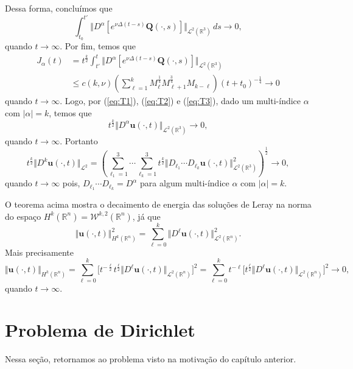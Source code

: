 \documentclass[a4paper, 11pt]{book}
\theoremstyle{definition}
\newcommand{\bR}{\mathbb{R}}
\newcommand{\bu}{\mathbf{u}}
\newcommand{\BQ}{\mathbf{Q}}
\newcommand{\cL}{\mathcal{L}}
\newcommand{\cW}{\mathcal{W}}
\begin{document}
\begin{prf}
    Dessa forma, concluímos que
    \begin{equation} \label{eq:T2}
        \int_{t_0}^{t'} \Vert D^\alpha [e^{\nu\Delta (t-s)}\BQ(\cdot,s)] \Vert_{\cL^2(\bR^3)} \,ds  \to 0,
    \end{equation}
    quando $t \to \infty$. 
    Por fim, temos que
    \begin{equation} \label{eq:T3}
        \begin{aligned}
            J_\alpha(t) &= t^{\frac{k}{2}} \int_{t'}^t \Vert D^\alpha[e^{\nu\Delta(t-s)}\BQ(\cdot,s)] \Vert_{\cL^2(\bR^3)} \\
            &\leqslant c(k,\nu) \left( \sum_{\ell=1}^k M_\ell^{\frac{1}{4}} M_{\ell+1}^{\frac{3}{4}} M_{k-\ell} \right) (t + t_0)^{-\frac{1}{4}} \to 0
        \end{aligned}
    \end{equation}
    quando $t \to \infty$. Logo, por (\ref{eq:T1}), (\ref{eq:T2}) e (\ref{eq:T3}), dado um multi-índice $\alpha$ com $|\alpha| = k$, temos que
    \[
        t^{\frac{k}{2}} \Vert D^\alpha \bu(\cdot,t) \Vert_{\cL^2(\bR^3)} \to 0,
    \]
    quando $t \to \infty$.
    Portanto
    \[
        t^{\frac{k}{2}} \Vert D^k \bu(\cdot,t) \Vert_{\cL^2} = \left( \sum_{\ell_1=1}^{3} \cdots \sum_{\ell_k=1}^3 t^{\frac{k}{2}} \Vert D_{\ell_1} \cdots D_{\ell_k} \bu(\cdot,t) \Vert_{\cL^2(\bR^3)}^2 \right)^{\frac{1}{2}} \to 0,
    \]
    quando $t \to \infty$ pois, $D_{\ell_1} \cdots D_{\ell_k} = D^\alpha$ para algum multi-índice $\alpha$ com $|\alpha| = k$.
\end{prf}


O teorema acima mostra o decaimento de energia das soluções de Leray na norma do espaço $H^k(\bR^n) = \cW^{k,2}(\bR^n)$, já que
\[
    \Vert \bu(\cdot,t) \Vert_{H^k(\bR^n)}^2 = \sum_{\ell = 0}^k \Vert D^\ell\bu(\cdot,t) \Vert_{\cL^2(\bR^n)}^2.
\]
Mais precisamente
\[
    \Vert \bu(\cdot,t) \Vert_{H^k(\bR^n)} = \sum_{\ell = 0}^k \big[ t^{-\frac{\ell}{2}} t^{\frac{\ell}{2}} \Vert D^\ell \bu(\cdot,t) \Vert_{\cL^2(\bR^n)} \big]^2 = \sum_{\ell = 0}^k t^{-\ell} \big[ t^{\frac{\ell}{2}} \Vert D^\ell \bu(\cdot,t) \Vert_{\cL^2(\bR^n)} \big]^2 \to 0,
\]
quando $t \to \infty$.

\section{Problema de Dirichlet} \label{sec:dirichlet}

Nessa seção, retornamos ao problema visto na motivação do capítulo anterior.
\end{document}

